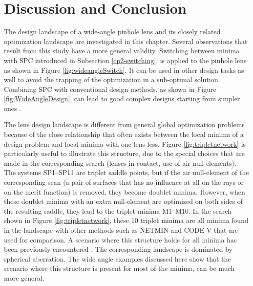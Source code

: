 \section{Discussion and Conclusion}
The design landscape of a wide-angle pinhole lens and its closely related optimization landscape are investigated in this chapter. Several observations that result from this study have a more general validity. Switching between minima with SPC introduced in Subsection \ref{cp2-switching}, is applied to the pinhole lens as shown in Figure \ref{fig:wideangleSwitch}. It can be used in other design tasks as well to avoid the trapping of the optimization in a sub-optimal solution. Combining SPC with conventional design methods, as shown in Figure \ref{fig:WideAngleDesign}, can lead to good complex designs starting from simpler ones \cite{LivshitsSP2014}.

The lens design landscape is different from general global optimization problems because of the close relationship that often exists between the local minima of a design problem and local minima with one lens less. Figure \ref{fig:tripletnetwork} is particularly useful to illustrate this structure, due to the special choices that are made in the corresponding search (lenses in contact, use of air null elements). The systems SP1–SP11 are triplet saddle points, but if the air null-element of the corresponding scan (a pair of surfaces that has no influence at all on the rays or on the merit function) is removed, they become doublet minima. However, when these doublet minima with an extra null-element are optimized on both sides of the resulting saddle, they lead to the triplet minima M1–M10. In the search shown in Figure \ref{fig:tripletnetwork}, these 10 triplet minima are all minima found in the landscape with other methods such as NETMIN and CODE V that are used for comparison. A scenario where this structure holds for all minima has been previously encountered \cite{PascalTriplet2009}. The corresponding landscape is dominated by spherical aberration. The wide angle examples discussed here show that the scenario where this structure is present for most of the minima, can be much more general.



